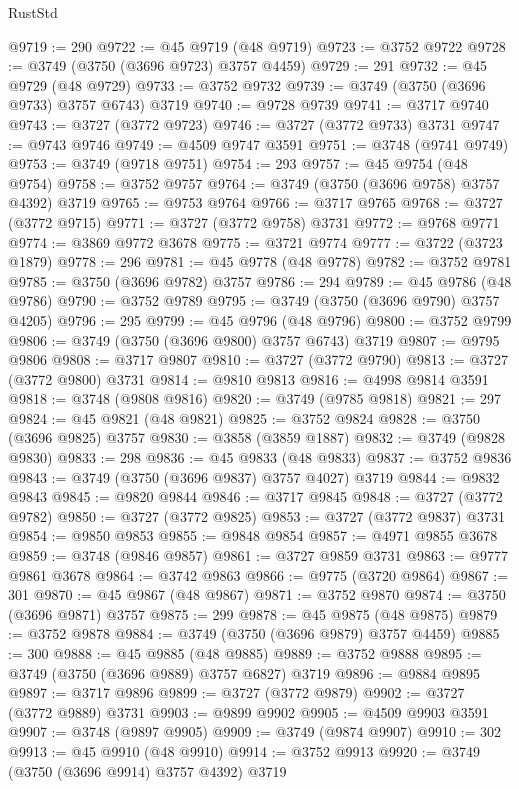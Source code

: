 \begin{lexlean}{RustStd}
\begin{coremodule}
@9719 := 290
@9722 := @45 @9719 (@48 @9719)
@9723 := @3752 @9722
@9728 := @3749 (@3750 (@3696 @9723) @3757 @4459)
@9729 := 291
@9732 := @45 @9729 (@48 @9729)
@9733 := @3752 @9732
@9739 := @3749 (@3750 (@3696 @9733) @3757 @6743) @3719
@9740 := @9728 @9739
@9741 := @3717 @9740
@9743 := @3727 (@3772 @9723)
@9746 := @3727 (@3772 @9733) @3731
@9747 := @9743 @9746
@9749 := @4509 @9747 @3591
@9751 := @3748 (@9741 @9749)
@9753 := @3749 (@9718 @9751)
@9754 := 293
@9757 := @45 @9754 (@48 @9754)
@9758 := @3752 @9757
@9764 := @3749 (@3750 (@3696 @9758) @3757 @4392) @3719
@9765 := @9753 @9764
@9766 := @3717 @9765
@9768 := @3727 (@3772 @9715)
@9771 := @3727 (@3772 @9758) @3731
@9772 := @9768 @9771
@9774 := @3869 @9772 @3678
@9775 := @3721 @9774
@9777 := @3722 (@3723 @1879)
@9778 := 296
@9781 := @45 @9778 (@48 @9778)
@9782 := @3752 @9781
@9785 := @3750 (@3696 @9782) @3757
@9786 := 294
@9789 := @45 @9786 (@48 @9786)
@9790 := @3752 @9789
@9795 := @3749 (@3750 (@3696 @9790) @3757 @4205)
@9796 := 295
@9799 := @45 @9796 (@48 @9796)
@9800 := @3752 @9799
@9806 := @3749 (@3750 (@3696 @9800) @3757 @6743) @3719
@9807 := @9795 @9806
@9808 := @3717 @9807
@9810 := @3727 (@3772 @9790)
@9813 := @3727 (@3772 @9800) @3731
@9814 := @9810 @9813
@9816 := @4998 @9814 @3591
@9818 := @3748 (@9808 @9816)
@9820 := @3749 (@9785 @9818)
@9821 := 297
@9824 := @45 @9821 (@48 @9821)
@9825 := @3752 @9824
@9828 := @3750 (@3696 @9825) @3757
@9830 := @3858 (@3859 @1887)
@9832 := @3749 (@9828 @9830)
@9833 := 298
@9836 := @45 @9833 (@48 @9833)
@9837 := @3752 @9836
@9843 := @3749 (@3750 (@3696 @9837) @3757 @4027) @3719
@9844 := @9832 @9843
@9845 := @9820 @9844
@9846 := @3717 @9845
@9848 := @3727 (@3772 @9782)
@9850 := @3727 (@3772 @9825)
@9853 := @3727 (@3772 @9837) @3731
@9854 := @9850 @9853
@9855 := @9848 @9854
@9857 := @4971 @9855 @3678
@9859 := @3748 (@9846 @9857)
@9861 := @3727 @9859 @3731
@9863 := @9777 @9861 @3678
@9864 := @3742 @9863
@9866 := @9775 (@3720 @9864)
@9867 := 301
@9870 := @45 @9867 (@48 @9867)
@9871 := @3752 @9870
@9874 := @3750 (@3696 @9871) @3757
@9875 := 299
@9878 := @45 @9875 (@48 @9875)
@9879 := @3752 @9878
@9884 := @3749 (@3750 (@3696 @9879) @3757 @4459)
@9885 := 300
@9888 := @45 @9885 (@48 @9885)
@9889 := @3752 @9888
@9895 := @3749 (@3750 (@3696 @9889) @3757 @6827) @3719
@9896 := @9884 @9895
@9897 := @3717 @9896
@9899 := @3727 (@3772 @9879)
@9902 := @3727 (@3772 @9889) @3731
@9903 := @9899 @9902
@9905 := @4509 @9903 @3591
@9907 := @3748 (@9897 @9905)
@9909 := @3749 (@9874 @9907)
@9910 := 302
@9913 := @45 @9910 (@48 @9910)
@9914 := @3752 @9913
@9920 := @3749 (@3750 (@3696 @9914) @3757 @4392) @3719

\end{coremodule}
\end{lexlean}
